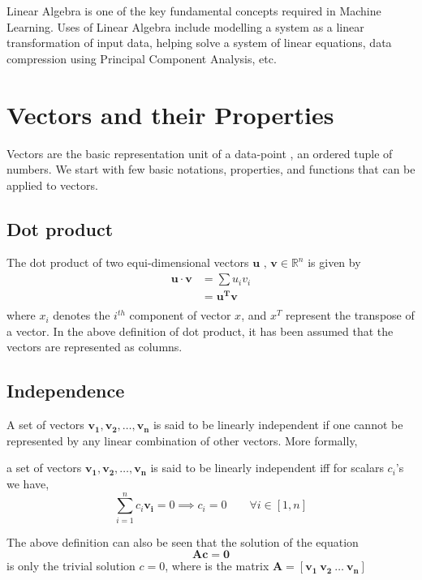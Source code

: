 \documentclass[12pt]{article}
\begin{document}
	\MakeScribeTop


Linear Algebra is one of the key fundamental concepts required in Machine Learning. Uses of Linear Algebra include  modelling a system as a linear transformation of input data, helping solve a system of linear equations, data compression using Principal Component Analysis, etc. 
\section{Vectors and their Properties}
Vectors are the basic representation unit of a data-point , an ordered tuple of numbers. 
We start with few basic notations, properties, and functions that can be applied to vectors.

\subsection{Dot product}
\begin{definition}
The dot product of two equi-dimensional vectors $\textbf{u , v} \in \mathbb{R}^n$ is given by 
\begin{align*}
     \mathbf{u}\cdot \mathbf{v} &= \sum u_iv_i\\
    &= \mathbf{u^T} \mathbf{v}\\
\end{align*}
where $x_i$ denotes the $i^{th}$ component of vector $x$, and $x^T$ represent the transpose of a vector. In the above definition of dot product, it has been assumed that the vectors are represented as columns.  
\end{definition}
\subsection{Independence}
A set of vectors $\mathbf{v_1 , v_2} , \hdots , \mathbf{v_n}$ is said to be linearly independent if one cannot be represented by any linear combination of other vectors. 
More formally,
\begin{definition}
a set of vectors $\mathbf{v_1 , v_2} , \hdots , \mathbf{v_n}$ is said to be linearly independent iff for scalars $c_i$'s we have,
$$
    \sum_{i=1}^n c_i\mathbf{v_i} = 0 \implies c_i = 0 \qquad\forall i \in [1,n]
$$
\end{definition}
The above definition can also be seen that the solution of the equation $$
\mathbf{A}\mathbf{c} = \mathbf{0} $$
is only the trivial solution $c=0$, where is the matrix $\mathbf{A} = [\mathbf{v_1} ~\mathbf{v_2} ~ \hdots ~\mathbf{v_n}]$
\pagebreak
\end{document}
